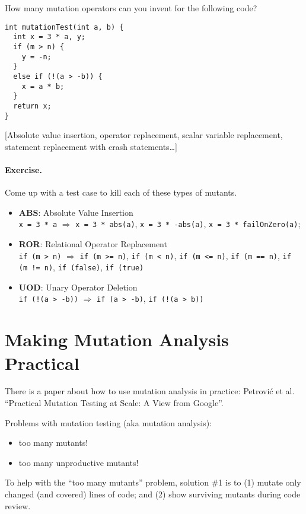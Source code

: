 \documentclass[11pt]{article}
\begin{document}
How
many mutation operators can you invent for the
following code?

{ \Large
\begin{lstlisting}
int mutationTest(int a, b) { 
  int x = 3 * a, y;
  if (m > n) {
    y = -n;
  }
  else if (!(a > -b)) {
    x = a * b;
  }
  return x;
}
\end{lstlisting}
}

[Absolute value insertion, operator replacement, scalar variable replacement,
  statement replacement with crash statements\ldots]

\paragraph{Exercise.} Come up with a test case to kill each of these types of
mutants.

\begin{itemize}
\item {\bf ABS}: Absolute Value Insertion\\
{\tt x = 3 * a}
$\Longrightarrow$ {\tt x = 3 * abs(a)}, {\tt x = 3 * -abs(a)}, {\tt x = 3 * failOnZero(a)};
\item {\bf ROR}: Relational Operator Replacement\\
{\tt if (m > n)} $\Longrightarrow$ {\tt if (m >= n)}, {\tt if (m < n)}, {\tt if (m <= n)}, {\tt if (m == n)}, {\tt if (m != n)}, {\tt if (false)}, {\tt if (true)}
\item {\bf UOD}: Unary Operator Deletion\\
{\tt if (!(a > -b))} $\Longrightarrow$ {\tt if (a > -b)}, {\tt if (!(a > b))}
\end{itemize}

\section*{Making Mutation Analysis Practical}

There is a paper about how to use mutation analysis in practice: Petrović et al. ``Practical Mutation Testing at Scale: A View from Google''.

Problems with mutation testing (aka mutation analysis):
  \begin{itemize}[noitemsep]
  \item too many mutants!
  \item too many unproductive mutants!
  \end{itemize}

To help with the ``too many mutants'' problem, solution \#1 is to (1) 
mutate only changed (and covered) lines of code; and (2) show surviving mutants during code review.
\end{document}
